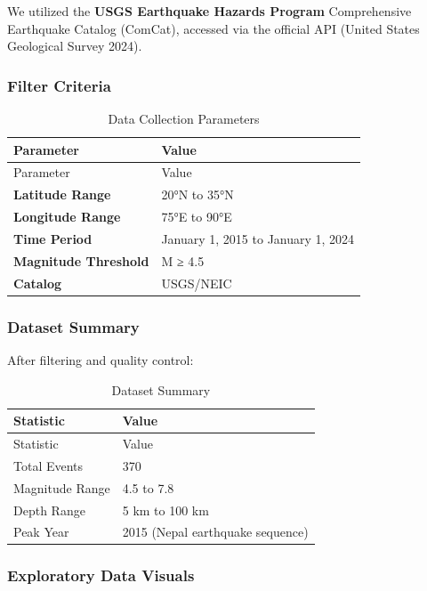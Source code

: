 \documentclass[
  11pt,
  a4paper,
  oneside,
  openany]{article}
\begin{document}
We utilized the \textbf{USGS Earthquake Hazards Program} Comprehensive
Earthquake Catalog (ComCat), accessed via the official API (United
States Geological Survey 2024).

\subsubsection{Filter Criteria}\label{filter-criteria}

\begin{longtable}[]{@{}ll@{}}
\caption{Data Collection Parameters}\label{tbl-params}\tabularnewline
\toprule\noalign{}
Parameter & Value \\
\midrule\noalign{}
\endfirsthead
\toprule\noalign{}
Parameter & Value \\
\midrule\noalign{}
\endhead
\bottomrule\noalign{}
\endlastfoot
\textbf{Latitude Range} & 20°N to 35°N \\
\textbf{Longitude Range} & 75°E to 90°E \\
\textbf{Time Period} & January 1, 2015 to January 1, 2024 \\
\textbf{Magnitude Threshold} & M ≥ 4.5 \\
\textbf{Catalog} & USGS/NEIC \\
\end{longtable}

\subsubsection{Dataset Summary}\label{dataset-summary}

After filtering and quality control:

\begin{longtable}[]{@{}ll@{}}
\caption{Dataset Summary}\label{tbl-dataset}\tabularnewline
\toprule\noalign{}
Statistic & Value \\
\midrule\noalign{}
\endfirsthead
\toprule\noalign{}
Statistic & Value \\
\midrule\noalign{}
\endhead
\bottomrule\noalign{}
\endlastfoot
Total Events & 370 \\
Magnitude Range & 4.5 to 7.8 \\
Depth Range & 5 km to 100 km \\
Peak Year & 2015 (Nepal earthquake sequence) \\
\end{longtable}

\subsubsection{Exploratory Data Visuals}\label{exploratory-data-visuals}
\end{document}
